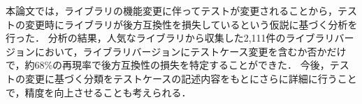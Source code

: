 \documentclass[submit]{ipsj}
\begin{document}
本論文では，ライブラリの機能変更に伴ってテストが変更されることから，テストの変更時にライブラリが後方互換性を損失しているという仮説に基づく分析を行った．
分析の結果，人気なライブラリから収集した2,111件のライブラリバージョンにおいて，ライブラリバージョンにテストケース変更を含むか否かだけで，約68\%の再現率で後方互換性の損失を特定することができた．
今後，テストの変更に基づく分類をテストケースの記述内容をもとにさらに詳細に行うことで，精度を向上させることも考えられる．





\begin{biography}
%
%
\end{biography}
\end{document}
